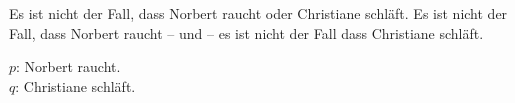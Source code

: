 \begin{frame}

\begin{exe}
	 Es ist nicht der Fall, dass Norbert raucht oder Christiane schläft.
	 Es ist nicht der Fall, dass Norbert raucht -- und -- es ist nicht der Fall dass Christiane schläft.
\end{exe} 

{\small 
	$p$: Norbert raucht.\\
	$q$: Christiane schläft.
}

\pause 

\begin{minipage}{0.48\textwidth}
	\centering
	
\end{minipage}
\pause
\begin{minipage}{0.48\textwidth}
	\centering
	

\end{minipage}

\end{frame}



